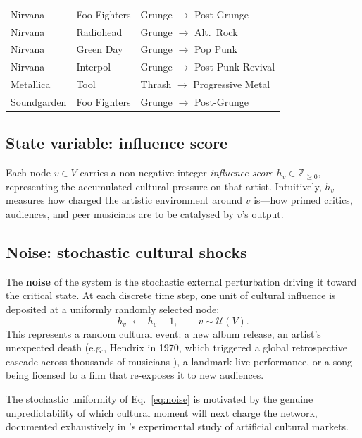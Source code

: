 \documentclass[12pt, a4paper]{article}
\begin{document}
\begin{longtable}{p{4.2cm} p{4.2cm} p{3cm}}
Nirvana             & Foo Fighters           & Grunge $\to$ Post-Grunge \\
Nirvana             & Radiohead              & Grunge $\to$ Alt.\ Rock \\
Nirvana             & Green Day              & Grunge $\to$ Pop Punk \\
Nirvana             & Interpol               & Grunge $\to$ Post-Punk Revival \\
Metallica           & Tool                   & Thrash $\to$ Progressive Metal \\
Soundgarden         & Foo Fighters           & Grunge $\to$ Post-Grunge \\
\end{longtable}

\subsection{State variable: influence score}

Each node $v\in V$ carries a non-negative integer
\textit{influence score} $h_v\in\mathbb{Z}_{\geq 0}$,
representing the accumulated cultural pressure on that artist.
Intuitively, $h_v$ measures how charged the artistic environment
around $v$ is---how primed critics, audiences, and peer musicians
are to be catalysed by $v$'s output.

\subsection{Noise: stochastic cultural shocks}

The \textbf{noise} of the system is the stochastic external
perturbation driving it toward the critical state.
At each discrete time step, one unit of cultural influence is
deposited at a uniformly randomly selected node:
\begin{equation}
  h_v \;\leftarrow\; h_v + 1, \qquad
  v \sim \mathcal{U}(V).
  \label{eq:noise}
\end{equation}
This represents a random cultural event: a new album release,
an artist's unexpected death (e.g., Hendrix in 1970, which
triggered a global retrospective cascade across thousands of
musicians \citep{cross2001}), a landmark live performance,
or a song being licensed to a film that re-exposes it to
new audiences.

The stochastic uniformity of Eq.~\eqref{eq:noise} is motivated
by the genuine unpredictability of which cultural moment will
next charge the network, documented exhaustively in
\citet{salganik2006}'s experimental study of artificial
cultural markets.
\end{document}

